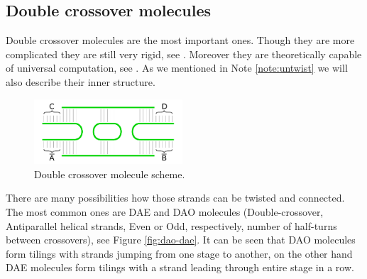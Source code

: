 	\subsection{Double crossover molecules}
	\label{sec:double_crossover}
		
		Double crossover molecules are the most important ones. Though they are more complicated they are still very rigid, see \cite{seeman93}. Moreover they are theoretically capable of universal computation, see \cite{winfree_phd}. As we mentioned in Note \ref{note:untwist} we will also describe their inner structure. %
		
		\begin{figure}[h]
		\begin{center}
			\includegraphics[width=0.492\textwidth]{./figures/strand_types/double_crossover.pdf}
			\caption{Double crossover molecule scheme.}
			\label{fig:double_crossover}
		\end{center}
		\end{figure}
		
		There are many possibilities how those strands can be twisted and connected. The most common ones are DAE and DAO molecules (Double-crossover, Antiparallel helical strands, Even or Odd, respectively, number of half-turns between crossovers), see Figure \ref{fig:dao-dae}. It can be seen that DAO molecules form tilings with strands jumping from one stage to another, on the other hand DAE molecules form tilings with a strand leading through entire stage in a row.
		

